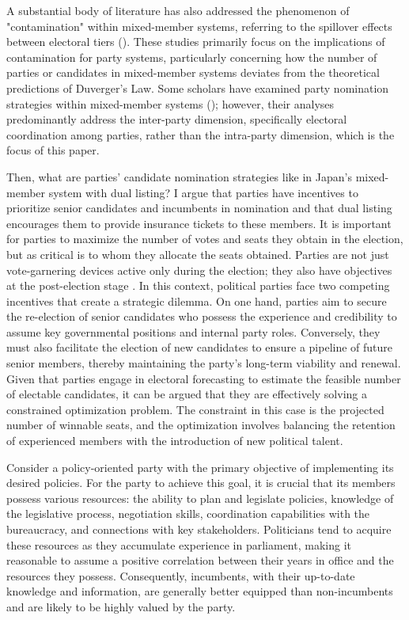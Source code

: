 \documentclass[a4paper, 11pt]{article}
\begin{document}
A substantial body of literature has also addressed the phenomenon of "contamination" within mixed-member systems, referring to the spillover effects between electoral tiers (\citealt{cox_interaction_2002, ferrara_mixed_2005, herron_contamination_2001, nishikawa_mixed_2004, moser_mixed_2004}). These studies primarily focus on the implications of contamination for party systems, particularly concerning how the number of parties or candidates in mixed-member systems deviates from the theoretical predictions of Duverger's Law. Some scholars have examined party nomination strategies within mixed-member systems (\citealt{ferrara_going_2005}); however, their analyses predominantly address the inter-party dimension, specifically electoral coordination among parties, rather than the intra-party dimension, which is the focus of this paper.

Then, what are parties' candidate nomination strategies like in Japan's mixed-member system with dual listing? I argue that parties have incentives to prioritize senior candidates and incumbents in nomination and that dual listing encourages them to provide insurance tickets to these members. It is important for parties to maximize the number of votes and seats they obtain in the election, but as critical is to whom they allocate the seats obtained. Parties are not just vote-garnering devices active only during the election; they also have objectives at the post-election stage \citep{matakos_electoral_2024, strom1990behavioral, strom_policy_1999}. In this context, political parties face two competing incentives that create a strategic dilemma. On one hand, parties aim to secure the re-election of senior candidates who possess the experience and credibility to assume key governmental positions and internal party roles. Conversely, they must also facilitate the election of new candidates to ensure a pipeline of future senior members, thereby maintaining the party's long-term viability and renewal. Given that parties engage in electoral forecasting to estimate the feasible number of electable candidates, it can be argued that they are effectively solving a constrained optimization problem. The constraint in this case is the projected number of winnable seats, and the optimization involves balancing the retention of experienced members with the introduction of new political talent.

Consider a policy-oriented party with the primary objective of implementing its desired policies. For the party to achieve this goal, it is crucial that its members possess various resources: the ability to plan and legislate policies, knowledge of the legislative process, negotiation skills, coordination capabilities with the bureaucracy, and connections with key stakeholders. Politicians tend to acquire these resources as they accumulate experience in parliament, making it reasonable to assume a positive correlation between their years in office and the resources they possess. Consequently, incumbents, with their up-to-date knowledge and information, are generally better equipped than non-incumbents and are likely to be highly valued by the party.
\end{document}
